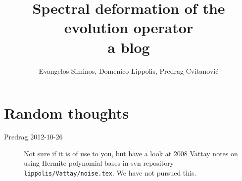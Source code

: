 \documentclass[10pt,openany]{book}
\title{Spectral deformation of the evolution operator
       \\ \Huge a blog}
\author{Evangelos Siminos, Domenico Lippolis,
        Predrag Cvitanovi\'{c}}
\begin{document}
\maketitle

\tableofcontents

\chapter{Random thoughts}
\label{s:strategy}

\begin{description}

\item[Predrag 2012-10-26]
Not sure if it is of use to you, but have a look at
2008 Vattay notes on using Hermite polynomial bases in svn repository
\texttt{lippolis/Vattay/noise.tex}. We have not pursued this.

\end{description}




\newpage
% 
% 


\newpage
% 
\end{document}
